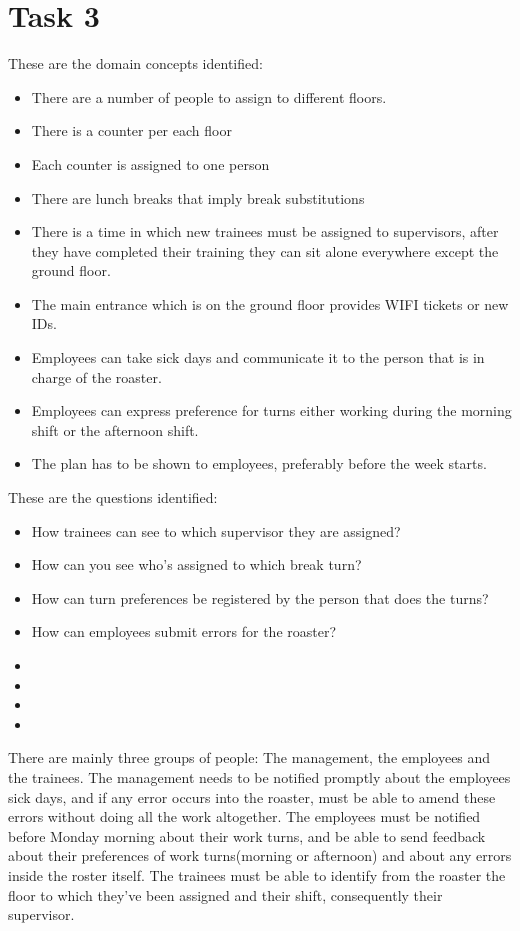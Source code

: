 \chapter{Task 3}
\begin{elenco}
	\item These are the domain concepts identified:
	\begin{itemize}
		\item There are a number of people to assign to different floors.
		\item There is a counter per each floor
		\item Each counter is assigned to one person
		\item There are lunch breaks that imply break substitutions 
		\item There is a time in which new trainees must be assigned to supervisors, after they have completed their training they can sit alone everywhere except the ground floor.
		\item The main entrance which is on the ground floor provides WIFI tickets or new IDs.
		\item Employees can take sick days and communicate it to the person that is in charge of the roaster.
		\item Employees can express preference for turns either working during the morning shift or the afternoon shift. 
		\item The plan has to be shown to employees, preferably before the week starts. 
	\end{itemize}
	\item These are the questions identified:
	\begin{itemize}
		\item How trainees can see to which supervisor they are assigned?
		\item How can you see who's assigned to which break turn?
		\item How can turn preferences be registered by the person that does the turns?
		\item How can employees submit errors for the roaster?
		\item 
		\item
		\item
		\item
	\end{itemize}
	\item There are mainly three groups of people: The management, the employees and the trainees. The management needs to be notified promptly about the employees sick days, and if any error occurs into the roaster, must be able to amend these errors without doing all the work altogether. The employees must be notified before Monday morning about their work turns, and be able to send feedback about their preferences of work turns(morning or afternoon) and about any errors inside the roster itself. The trainees must be able to identify from the roaster the floor to which they've been assigned and their shift, consequently their supervisor. 

\end{elenco}

